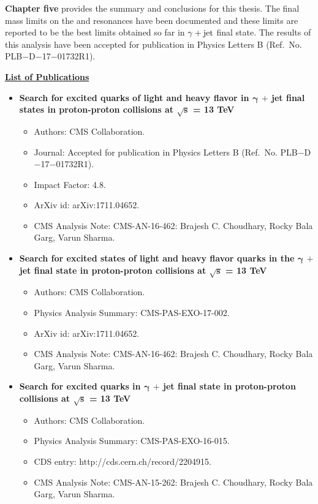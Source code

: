 \documentclass[12pt,a4]{article}
\begin{document}
\textbf{Chapter five} provides the summary and conclusions for this thesis. The final mass limits on the \qstar and \bstar resonances have been
documented and these limits are reported to be the best limits obtained so far
in $\gamma+\mathrm{jet}$ final state. The results of this analysis have been accepted for publication in Physics Letters B (Ref.\ No.\: PLB$-$D$-$17$-$01732R1). 

\newpage



\newpage
\begin{center}
  \textbf{\large{\underline{List of Publications}}}
  \begin{itemize}
  \item \textbf{Search for excited quarks of light and heavy flavor in $\mathbold{\gamma}$ $+$ jet final states in proton-proton collisions at $\mathbold{\sqrt{s}}$
    = 13 TeV}
    \begin{itemize}
    \item Authors: CMS Collaboration.
    \item Journal: Accepted for publication in Physics Letters B (Ref.\ No.\: PLB$-$D$-$17$-$01732R1).
    \item Impact Factor: 4.8.
    \item ArXiv id: arXiv:1711.04652.
      \item CMS Analysis Note: CMS-AN-16-462: Brajesh C. Choudhary, Rocky Bala Garg, Varun Sharma.
    \end{itemize}
  \item \textbf{Search for excited states of light and heavy flavor quarks in the $\mathbold{\gamma}$ $+$ jet final state in proton-proton collisions
    at $\mathbold{\sqrt{s}}$ = 13 TeV}
    \begin{itemize}
    \item Authors: CMS Collaboration.
    \item Physics Analysis Summary: CMS-PAS-EXO-17-002.
    \item ArXiv id: arXiv:1711.04652.
    \item CMS Analysis Note: CMS-AN-16-462: Brajesh C. Choudhary, Rocky Bala Garg, Varun Sharma.
    \end{itemize}
  \item \textbf{Search for excited quarks in $\mathbold{\gamma}$ $+$ jet final state in proton-proton collisions at $\mathbold{\sqrt{s}}$ = 13 TeV}
    \begin{itemize}
    \item Authors: CMS Collaboration.
    \item Physics Analysis Summary: CMS-PAS-EXO-16-015.
    \item CDS entry: http://cds.cern.ch/record/2204915.
      \item CMS Analysis Note: CMS-AN-15-262: Brajesh C. Choudhary, Rocky Bala Garg, Varun Sharma.
    \end{itemize}
  \end{itemize}
\end{center}
\end{document}
